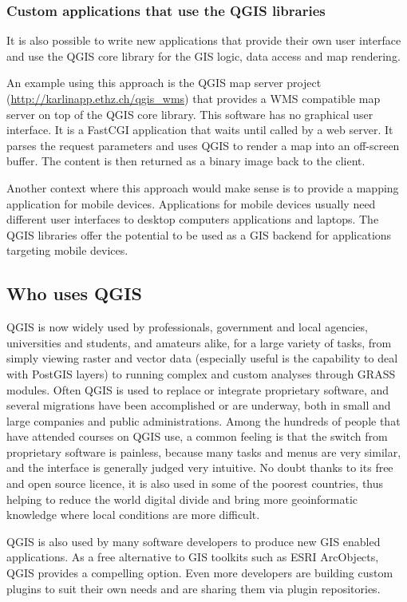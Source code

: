 \subsubsection{Custom applications that use the QGIS libraries}
It is also possible to write new applications that provide their own user
interface and use the QGIS core library for the GIS logic, data access and map
rendering. 

An example using this approach is the QGIS map server project
(\url{http://karlinapp.ethz.ch/qgis\_wms}) that provides a WMS
compatible map server on top of the QGIS core library. This software has no 
graphical user interface. It is a FastCGI application that waits until called
by a web server. It parses the request parameters and uses QGIS to render a map
into an off-screen buffer. The content is then returned as a binary image back to
the client.

Another context where this approach would make sense is to provide a mapping
application for mobile devices. Applications for mobile devices usually need
different user interfaces to desktop computers applications and
laptops. The QGIS libraries offer the potential to be used as a GIS backend for 
applications targeting mobile devices.

\subsection{Who uses QGIS}
QGIS is now widely used by professionals, government and local agencies,
universities and students, and amateurs alike, for a large variety of tasks,
from simply viewing raster and vector data (especially useful is the capability
to deal with PostGIS layers) to running complex and custom analyses through
GRASS modules. Often QGIS is used to replace or integrate proprietary software, and
several migrations have been accomplished or are underway, both in small and 
large companies and public administrations. Among the hundreds of people that
have attended courses on QGIS use, a common feeling is that the switch from
proprietary software is painless, because many tasks and menus are very similar,
and the interface is generally judged very intuitive. No doubt thanks to its
free and open source licence, it is also used in some of the poorest countries,
thus helping to reduce the world digital divide and bring more geoinformatic
knowledge where local conditions are more difficult.

QGIS is also used by many software developers to produce new GIS enabled
applications. As a free alternative to GIS toolkits such as ESRI ArcObjects,
QGIS provides a compelling option. Even more developers are building custom
plugins to suit their own needs and are sharing them via plugin repositories. 

